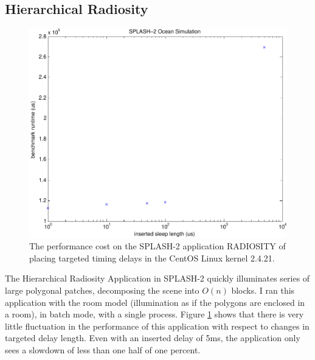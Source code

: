 \documentclass[12pt,conference]{IEEEtran}
\begin{document}
\subsection{Hierarchical Radiosity}
\begin{figure}
\centering
\includegraphics[width=\columnwidth]{ocean}
\caption{The performance cost on the SPLASH-2 application RADIOSITY of placing targeted timing delays in the CentOS Linux kernel 2.4.21.}
\label{fig_radiosity}
\end{figure}
The Hierarchical Radiosity Application \cite{Hanrahan1991} in SPLASH-2 quickly illuminates series of large polygonal patches, decomposing the scene into $O(n)$ blocks.  I ran this application with the room model (illumination as if the polygons are enclosed in a room), in batch mode, with a single process.  Figure \ref{fig_radiosity} shows that there is very little fluctuation in the performance of this application with respect to changes in targeted delay length.  Even with an inserted delay of 5ms, the application only sees a slowdown of less than one half of one percent.
\end{document}
